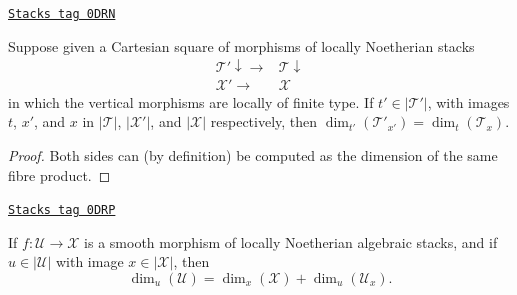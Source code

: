 \begin{lemma}
\label{stacks-geometry-lemma-base-change-invariance-of-relative-dimension}
\href{https://stacks.math.columbia.edu/tag/0DRN}{\texttt{Stacks tag 0DRN}}

Suppose given
a Cartesian square of morphisms of locally Noetherian stacks
$$
\begin{array}{cc}\mathcal{T}' \downarrow\longrightarrow & \mathcal{T} \downarrow \\ \mathcal{X}' \longrightarrow & \mathcal{X}\end{array}
$$
in which the vertical morphisms are locally of finite type.
If $t' \in |\mathcal{T}'|$,
with images $t$, $x'$, and $x$ in $|\mathcal{T}|$, $|\mathcal{X}'|$, and
$|\mathcal{X}|$
respectively, then $\dim_{t'}(\mathcal{T}'_{x'}) = \dim_{t}(\mathcal{T}_x).$
\end{lemma}

\begin{proof}
Both sides can (by definition) be computed as the
dimension of the same fibre product.
\end{proof}

\begin{lemma}
\label{stacks-geometry-lemma-behaviour-of-dimensions-wrt-smooth-morphisms-stacky}
\href{https://stacks.math.columbia.edu/tag/0DRP}{\texttt{Stacks tag 0DRP}}

If $f: \mathcal{U} \to \mathcal{X}$ is a smooth morphism of locally Noetherian
algebraic stacks, and
if $u \in |\mathcal{U}|$ with image $x \in |\mathcal{X}|$,
then
$$
\dim_u (\mathcal{U}) = \dim_x(\mathcal{X}) + \dim_{u} (\mathcal{U}_x).
$$
\end{lemma}

